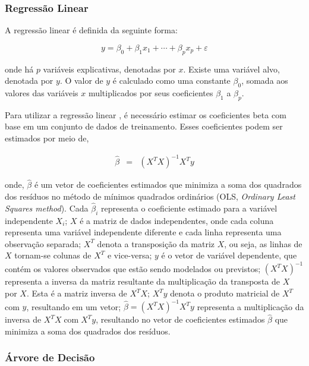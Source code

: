  
 \subsubsection{Regress\~ao Linear}
 
 A regressão linear é definida da seguinte forma:
 
 \begin{equation}
 	y = \beta_0 + \beta_1 x_1 + \cdots + \beta_p x_p + \varepsilon \label{eq:lr}
 \end{equation}
 
 \noindent onde há $p$ variáveis explicativas, denotadas por $x$. Existe uma variável alvo, denotada por $y$. O valor de $y$ é calculado como uma constante $\beta_0$, somada aos valores das variáveis $x$ multiplicados por seus coeficientes $\beta_1$ a $\beta_p$.
 
 
 Para utilizar a regressão linear \cite{korstanje2021}, é necessário estimar os coeficientes beta com base em um conjunto de dados de treinamento. Esses coeficientes podem ser estimados por meio de,
 
 \begin{eqnarray}
 	\hat{\beta}&=&\left(X^T X\right)^{-1} X^T y\label{eq:ols}
 \end{eqnarray}
 
 \noindent onde, $\hat{\beta}$ é um vetor de coeficientes estimados que minimiza a soma dos quadrados dos resíduos no método de mínimos quadrados ordinários (OLS, \textit{Ordinary Least Squares method}). Cada $\hat{\beta}_i$ representa o coeficiente estimado para a variável independente $X_i$;
 $X$ é a matriz de dados independentes, onde cada coluna representa uma variável independente diferente e cada linha representa uma observação separada;
 $X^T$ denota a transposição da matriz $X$, ou seja, as linhas de $X$ tornam-se colunas de $X^T$ e vice-versa;
 $y$ é o vetor de variável dependente, que contém os valores observados que estão sendo modelados ou previstos;
 $\left(X^T X\right)^{-1}$ representa a inversa da matriz resultante da multiplicação da transposta de $X$ por $X$. Esta é a matriz inversa de $X^T X$;
 $X^T y$ denota o produto matricial de $X^T$ com $y$, resultando em um vetor;
 $\hat{\beta}=\left(X^T X\right)^{-1} X^T y$ representa a multiplicação da inversa de $X^T X \operatorname{com} X^T y$, resultando no vetor de coeficientes estimados $\hat{\beta}$ que minimiza a soma dos quadrados dos resíduos.
 
 
 \subsubsection{\'Arvore de Decis\~ao}
 
